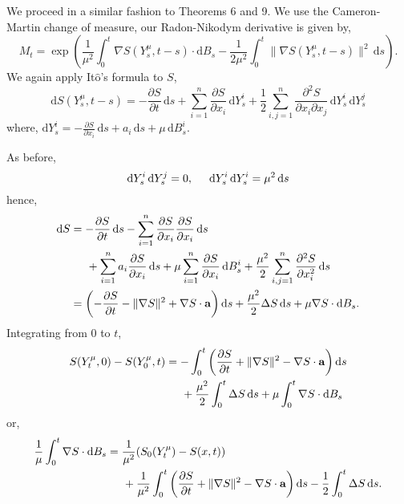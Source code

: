 \documentclass[a4paper,12pt,draft]{report}
\begin{document}
{
We proceed in a similar fashion to Theorems 6 and 9.  We use the Cameron-Martin change of measure, our Radon-Nikodym derivative is given by,
$$
M_t = \exp\left(\frac{1}{\mu^2}\int_0^t\nabla S(Y_s^\mu, t - s)\cdot\mathrm{d}B_s - \frac{1}{2\mu^2}\int_0^t\|\nabla S(Y_s^\mu, t - s)\|^2\,\mathrm{d}s\right).
$$
We again apply It$\mathrm{\hat{o}}$'s formula to $S$,
$$
\mathrm{d}S(Y_s^\mu, t -s) = -\frac{\partial S}{\partial t}\,\mathrm{d}s + \sum_{i = 1}^n\frac{\partial S}{\partial x_i}\,\mathrm{d}Y_s^i + \frac{1}{2}\sum_{i, j = 1}^n\frac{\partial^2 S}{\partial x_i \partial x_j}\,\mathrm{d}Y_s^i\,\mathrm{d}Y_s^j
$$
where, $\mathrm{d}Y_s^i = -\frac{\partial S}{\partial x_i}\,\mathrm{d}s + a_i\,\mathrm{d}s + \mu\,\mathrm{d}B_s^i$.

As before,
$$
\mathrm{d}Y_s^i\,\mathrm{d}Y_s^j = 0, \hspace{0.5cm} \mathrm{d}Y_s^i\,\mathrm{d}Y_s^i = \mu^2\,\mathrm{d}s
$$
hence,
\begin{align}
\mathrm{d}S & = -\frac{\partial S}{\partial t}\,\mathrm{d}s - \sum_{i = 1}^n\frac{\partial S}{\partial x_i}\frac{\partial S}{\partial x_i}\,\mathrm{d}s\nonumber\\
& \hspace{0.5cm} + \sum_{i = 1}^na_i\frac{\partial S}{\partial x_i}\,\mathrm{d}s + \mu\sum_{i = 1}^n\frac{\partial S}{\partial x_i}\,\mathrm{d}B_s^i + \frac{\mu^2}{2}\sum_{i, j = 1}^n\frac{\partial^2 S}{\partial x_i^2}\,\mathrm{d}s\nonumber\\
& = \left(-\frac{\partial S}{\partial t} - \|\nabla S\|^2 + \nabla S\cdot\mathbf{a}\right)\mathrm{d}s + \frac{\mu^2}{2}\Delta S\,\mathrm{d}s + \mu\nabla S\cdot\mathrm{d}B_s.\nonumber
\end{align}
Integrating from $0$ to $t$,
\begin{align}
S(Y_t^\mu, 0) - S(Y_0^\mu, t) & = -\int_0^t\left(\frac{\partial S}{\partial t} + \|\nabla S\|^2 - \nabla S\cdot\mathbf{a}\right)\mathrm{d}s\nonumber\\
& \hspace{0.5cm} + \frac{\mu^2}{2}\int_0^t\Delta S\,\mathrm{d}s + \mu\int_0^t\nabla S\cdot\mathrm{d}B_s\nonumber
\end{align}
or,
\begin{align}
\frac{1}{\mu}\int_0^t\nabla S\cdot\mathrm{d}B_s & = \frac{1}{\mu^2}(S_0(Y_t^\mu) - S(x, t))\nonumber\\
& \hspace{0.5cm} + \frac{1}{\mu^2}\int_0^t\left(\frac{\partial S}{\partial t} + \|\nabla S\|^2 - \nabla S\cdot\mathbf{a}\right)\mathrm{d}s - \frac{1}{2}\int_0^t\Delta S\,\mathrm{d}s.\nonumber

\end{align}}
\end{document}
